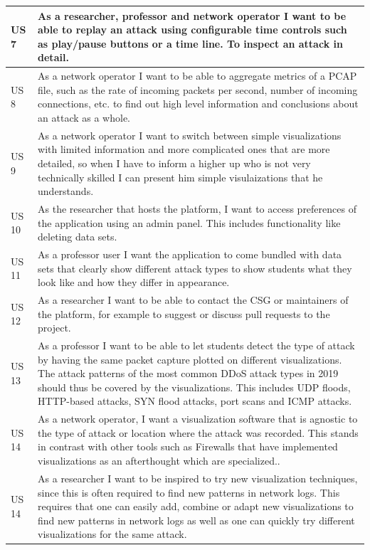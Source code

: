 \begin{table}[]
\begin{tabular}{|p{1.1cm}|p{12cm}|}
US 7         & As a researcher, professor and network operator I want to be able to replay an attack using configurable time controls such as play/pause buttons or a time line. To inspect an attack in detail.\\ \hline
US 8         & As a network operator I want to be able to aggregate metrics of a PCAP file, such as the rate of incoming packets per second, number of incoming connections, etc. to find out high level information and conclusions about an attack as a whole.\\ \hline
US 9         & As a network operator I want to switch between simple visualizations with limited information and more complicated ones that are more detailed, so when I have to inform a higher up who is not very technically skilled I can present him simple visulaizations that he understands.\\ \hline
US 10        & As the researcher that hosts the platform, I want to access preferences of the application using an admin panel. This includes functionality like deleting data sets.\\ \hline
US 11        & As a professor user I want the application to come bundled with data sets that clearly show different attack types to show students what they look like and how they differ in appearance.\\ \hline
US 12        & As a researcher I want to be able to contact the CSG or maintainers of the platform, for example to suggest or discuss pull requests to the project.\\ \hline
US 13        & As a professor I want to be able to let students detect the type of attack by having the same packet capture plotted on different visualizations. The attack patterns of the most common DDoS attack types in 2019 should thus be covered by the visualizations\footnotemark. This includes UDP floods, HTTP-based attacks, SYN flood attacks, port scans and ICMP attacks.\\ \hline
US 14       & As a network operator, I want a visualization software that is agnostic to the type of attack or location where the attack was recorded. This stands in contrast with other tools such as Firewalls that have implemented visualizations as an afterthought which are specialized.\cite{appliedsecurityvisualizations}.\\ \hline
US 14       & As a researcher I want to be inspired to try new visualization techniques, since this is often required to find new patterns in network logs\cite{appliedsecurityvisualizations}. This requires that one can easily add, combine or adapt new visualizations to find new patterns in network logs as well as one can quickly try different visualizations for the same attack.\\ \hline

\end{tabular}
\end{table}
